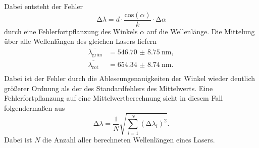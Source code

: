\newpage
Dabei entsteht der Fehler 
\begin{equation}
\increment \lambda = d \cdot \frac{\text{cos}(\alpha)}{k} \cdot \increment \alpha
\end{equation}
durch eine Fehlerfortpflanzung des Winkels $\alpha$ auf die Wellenlänge.
Die Mittelung über alle Wellenlängen des gleichen Lasers liefern
\begin{align*}
\overline{\lambda_{\text{grün}}} &= \SI{546.70(875)}{\nano\meter},\\
\overline{\lambda_{\text{rot}}} &= \SI{654.34(874)}{\nano\meter}.\\
\end{align*}
Dabei ist der Fehler durch die Ableseungenauigkeiten der Winkel wieder deutlich größerer Ordnung als der des Standardfehlers des Mittelwerts. Eine Fehlerfortpflanzung auf eine Mittelwertberechnung
sieht in diesem Fall folgendermaßen aus
\begin{equation}
\increment \lambda = \frac{1}{N} \sqrt{\sum_{i=1}^{N} (\increment \lambda_{i})^2}.
\end{equation}
Dabei ist $N$ die Anzahl aller berechneten Wellenlängen eines Lasers.


%

    